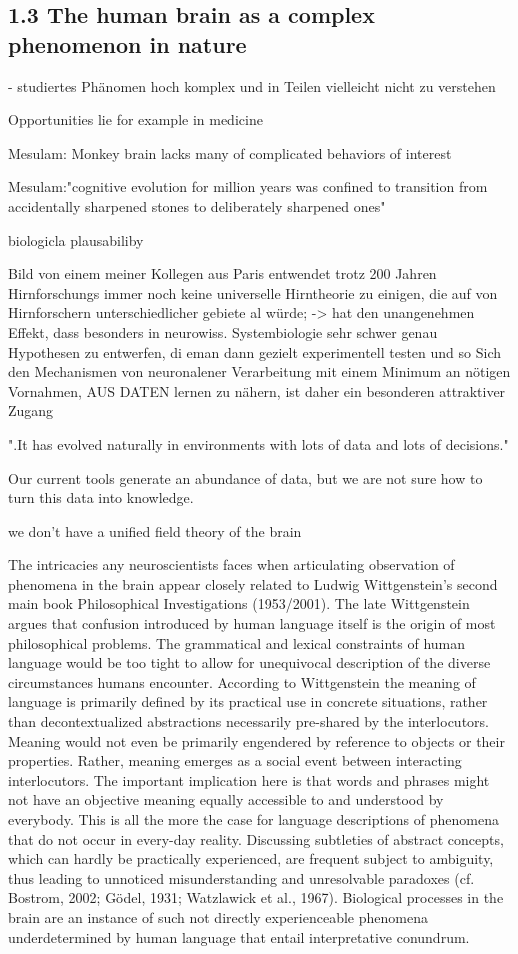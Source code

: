 \documentclass[authoryear,review,3p]{elsarticle}
\begin{document}
\subsection*{1.3 The human brain as a complex phenomenon in nature}

- studiertes Phänomen hoch komplex und in Teilen vielleicht nicht zu verstehen

Opportunities lie for example in medicine

Mesulam:
Monkey brain lacks many of complicated behaviors of interest

Mesulam:"cognitive evolution for million years was confined to transition from accidentally sharpened stones to deliberately sharpened ones"



biologicla plausabiliby

Bild von einem meiner Kollegen aus Paris entwendet
trotz 200 Jahren Hirnforschungs immer noch keine universelle Hirntheorie zu einigen, die auf von Hirnforschern unterschiedlicher gebiete al würde;
-> hat den unangenehmen Effekt, dass besonders in neurowiss. Systembiologie sehr schwer genau Hypothesen zu entwerfen, di eman dann gezielt experimentell testen und so
Sich den Mechanismen von neuronalener Verarbeitung mit einem Minimum an nötigen Vornahmen, AUS DATEN lernen zu nähern, ist daher ein besonderen attraktiver Zugang

".It has evolved naturally in environments with lots of data and lots of decisions."

Our current tools generate an abundance of data, but we are not sure how to turn this data into knowledge.

we don’t have a unified field theory of the brain


The intricacies any neuroscientists faces when articulating observation of phenomena in the brain appear closely related to Ludwig Wittgenstein's second main book Philosophical Investigations (1953/2001). The late Wittgenstein argues that confusion introduced by human language itself is the origin of most philosophical problems. The grammatical and lexical constraints of human language would be too tight to allow for unequivocal description of the diverse circumstances humans encounter. According to Wittgenstein the meaning of language is primarily defined by its practical use in concrete situations, rather than decontextualized abstractions necessarily pre-shared by the interlocutors. Meaning would not even be primarily engendered by reference to objects or their properties. Rather, meaning emerges as a social event between interacting interlocutors. The important implication here is that words and phrases might not have an objective meaning equally accessible to and understood by everybody. This is all the more the case for language descriptions of phenomena that do not occur in every-day reality. Discussing subtleties of abstract concepts, which can hardly be practically experienced, are frequent subject to ambiguity, thus leading to unnoticed misunderstanding and unresolvable paradoxes (cf. Bostrom, 2002; Gödel, 1931; Watzlawick et al., 1967). Biological processes in the brain are an instance of such not directly experienceable phenomena underdetermined by human language that entail interpretative conundrum.
\end{document}
